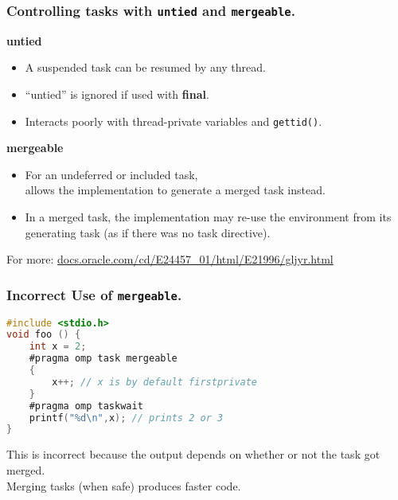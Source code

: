 \begin{frame}
  \frametitle{Controlling tasks with {\tt untied} and {\tt mergeable}.}

  
\begin{center}
  {\bf untied}
\end{center}
  \begin{itemize}
    \item A suspended task can be resumed by any thread.
    \item ``untied'' is ignored if used with {\bf final}.
    \item Interacts poorly with thread-private variables and {\tt gettid()}.
  \end{itemize}

\begin{center}
  {\bf mergeable}
\end{center}

  \begin{itemize}
    \item For an undeferred or included task,\\
    \hspace*{2em} allows the implementation to generate a merged task instead.
    \item In a merged task, the implementation may re-use the environment from its generating task (as if there was no task directive).
  \end{itemize}

  For more: \url{docs.oracle.com/cd/E24457_01/html/E21996/gljyr.html}
  
\end{frame}

\begin{frame}[fragile]
  \frametitle{Incorrect Use of {\tt mergeable}.}

  
\begin{changemargin}{1.5cm}  
  \begin{lstlisting}[language=C,morekeywords={foreach,pragma,omp,parallel,single,nowait,task,untied,barrier,taskyield,mergeable,final,taskwait,critical}]
#include <stdio.h>
void foo () {
    int x = 2;
    #pragma omp task mergeable
    {
        x++; // x is by default firstprivate
    }
    #pragma omp taskwait
    printf("%d\n",x); // prints 2 or 3
}
  \end{lstlisting}

\large
    This is incorrect because the output depends
      on whether or not the task got merged.\\[1em]
    Merging tasks (when safe) produces faster code.
\end{changemargin}
\end{frame}

